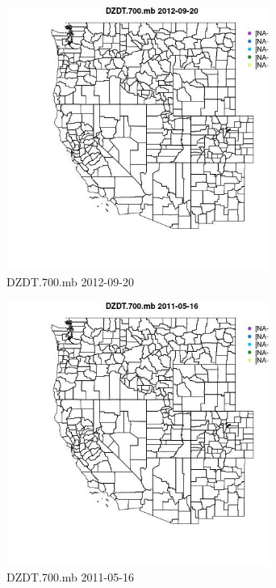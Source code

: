 \begin{figure} 
\centering  
\includegraphics[width=0.77\textwidth]{Code_Outputs/ML_input_report_ML_input_PM25_Step5_part_d_de_duplicated_aves_ML_input_MapObsDZDT700mb2012-09-20.jpg} 
\caption{\label{fig:ML_input_report_ML_input_PM25_Step5_part_d_de_duplicated_aves_ML_inputMapObsDZDT700mb2012-09-20}DZDT.700.mb 2012-09-20} 
\end{figure} 
 

\begin{figure} 
\centering  
\includegraphics[width=0.77\textwidth]{Code_Outputs/ML_input_report_ML_input_PM25_Step5_part_d_de_duplicated_aves_ML_input_MapObsDZDT700mb2011-05-16.jpg} 
\caption{\label{fig:ML_input_report_ML_input_PM25_Step5_part_d_de_duplicated_aves_ML_inputMapObsDZDT700mb2011-05-16}DZDT.700.mb 2011-05-16} 
\end{figure} 
 

